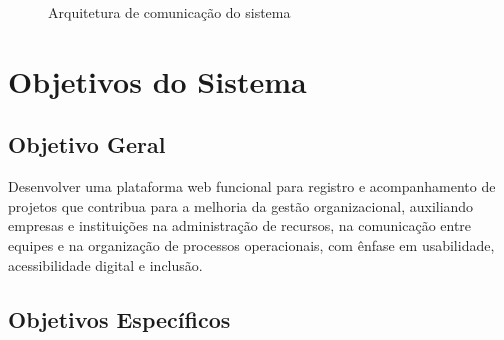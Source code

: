 \documentclass[a4paper,12pt,oneside]{article}
\begin{document}
\begin{figure}[H]
\centering
{}
\caption{Arquitetura de comunicação do sistema}
\label{fig:arquitetura}
\end{figure}

\section{Objetivos do Sistema}

\subsection{Objetivo Geral}

Desenvolver uma plataforma web funcional para registro e acompanhamento de projetos que contribua para a melhoria da gestão organizacional, auxiliando empresas e instituições na administração de recursos, na comunicação entre equipes e na organização de processos operacionais, com ênfase em usabilidade, acessibilidade digital e inclusão.

\subsection{Objetivos Específicos}
\end{document}
